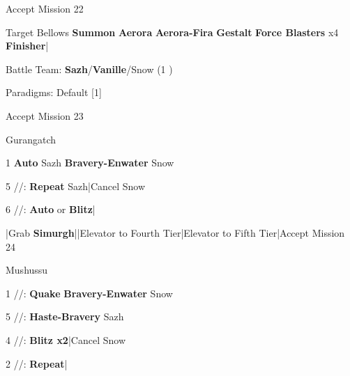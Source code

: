 \begin{mainlist}
	\item Accept Mission 22
	\item {} Target Bellows \to \textbf{Summon} \to \textbf{Aerora} \to \textbf{Aerora-Fira} \to \textbf{Gestalt} \to \textbf{Force Blasters} x4 \to \textbf{Finisher}|\skip
\end{mainlist}
\begin{menu}
	\item Battle Team: \textbf{Sazh}/\textbf{Vanille}/Snow (1 )
	\item Paradigms: Default [1]
\end{menu}
\begin{mainlist}
	\item Accept Mission 23
\end{mainlist}
\begin{fight}{Gurangatch}
	\item [1] \textbf{Auto} Sazh \to \textbf{Bravery-Enwater} Snow
	\item [5] \syn/\sab/\com: \textbf{Repeat} Sazh|Cancel Snow
	\item [6] \com/\rav/\com: \textbf{Auto} or \textbf{Blitz}|\skip
\end{fight}
\begin{mainlist}
	\item \skip|Grab \textbf{Simurgh}|\skip|Elevator to Fourth Tier|Elevator to Fifth Tier|Accept Mission 24
\end{mainlist}
\begin{fight}{Mushussu}
	\item [1] \syn/\sab/\rav: \textbf{Quake} \to \textbf{Bravery-Enwater} Snow
	\item [5] \syn/\sab/\com: \textbf{Haste-Bravery} Sazh
	\item [4] \com/\sab/\com: \textbf{Blitz x2}|Cancel Snow
	\item [2] \com/\med/\com: \textbf{Repeat}|\skip
\end{fight}
